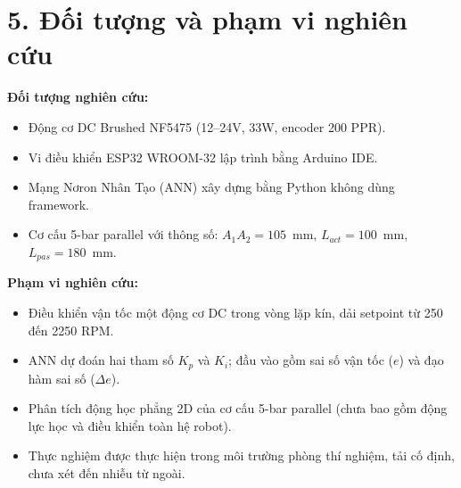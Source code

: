 \section*{5. Đối tượng và phạm vi nghiên cứu}

\textbf{Đối tượng nghiên cứu:}
\begin{itemize}[leftmargin=1.5cm]
    \item Động cơ DC Brushed NF5475 (12--24V, 33W, encoder 200 PPR).
    \item Vi điều khiển ESP32 WROOM-32 lập trình bằng Arduino IDE.
    \item Mạng Nơron Nhân Tạo (ANN) xây dựng bằng Python không dùng framework.
    \item Cơ cấu 5-bar parallel với thông số: $A_1A_2 = 105$~mm,
    $L_{act} = 100$~mm, $L_{pas} = 180$~mm.
\end{itemize}

\textbf{Phạm vi nghiên cứu:}
\begin{itemize}[leftmargin=1.5cm]
    \item Điều khiển vận tốc một động cơ DC trong vòng lặp kín, dải setpoint từ
    250 đến 2250 RPM.
    \item ANN dự đoán hai tham số $K_p$ và $K_i$; đầu vào gồm sai số vận tốc
    ($e$) và đạo hàm sai số ($\Delta e$).
    \item Phân tích động học phẳng 2D của cơ cấu 5-bar parallel (chưa bao gồm
    động lực học và điều khiển toàn hệ robot).
    \item Thực nghiệm được thực hiện trong môi trường phòng thí nghiệm, tải cố
    định, chưa xét đến nhiễu từ ngoài.
\end{itemize}
